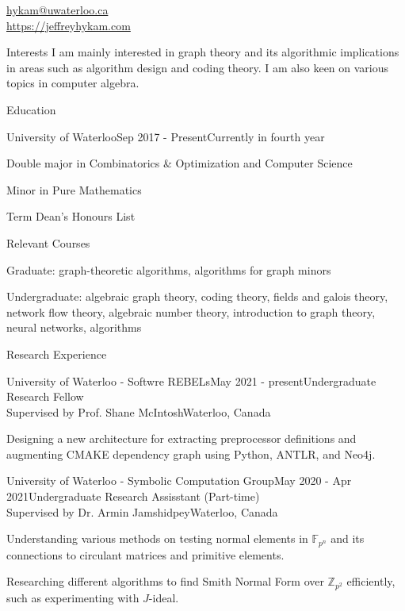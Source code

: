 \documentclass{cv}
\begin{document}

\href{hykam@uwaterloo.ca}{hykam@uwaterloo.ca} \\
\href{https://jeffreyhykam.com}{https://jeffreyhykam.com}

\begin{rSection}{Interests}
	I am mainly interested in graph theory and its algorithmic implications in areas such as 
	algorithm design and coding theory. I am also keen on various topics in computer algebra.
\end{rSection}

\begin{rSection}{Education}
\begin{rSubsection}{University of Waterloo}{Sep 2017 - Present}{Currently in fourth year}{}
	\item Double major in Combinatorics \& Optimization and Computer Science
	\item Minor in Pure Mathematics
	\item Term Dean's Honours List
\end{rSubsection}

\begin{rSubsection}{Relevant Courses}{}{}{}
	\item Graduate: graph-theoretic algorithms, algorithms for graph minors
	\item Undergraduate: algebraic graph theory, coding theory, fields and galois theory, network flow theory, 
	algebraic number theory, introduction to graph theory, neural networks, algorithms
\end{rSubsection}
\end{rSection}

\begin{rSection}{Research Experience}
\begin{rSubsection}{University of Waterloo - Softwre REBELs}{May 2021 - present}{Undergraduate Research Fellow \\ Supervised by Prof. Shane McIntosh}{Waterloo, Canada}
	\item Designing a new architecture for extracting preprocessor definitions and augmenting CMAKE dependency graph
	using Python, ANTLR, and Neo4j.
\end{rSubsection}

\begin{rSubsection}{University of Waterloo - Symbolic Computation Group}{May 2020 - Apr 2021}{Undergraduate Research Assisstant (Part-time)\\ Supervised by Dr. Armin Jamshidpey}{Waterloo, Canada}
    \item Understanding various methods on testing normal elements in $\mathbb{F}_{p^n}$ and its connections to circulant matrices and primitive elements.
  	\item Researching different algorithms to find Smith Normal Form over $\mathbb{Z}_{p^2}$ efficiently, such as experimenting with $J$-ideal.
\end{rSubsection}
\end{rSection}
\end{document}

